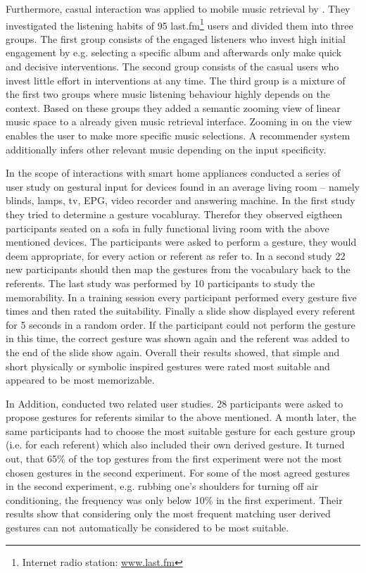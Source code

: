 Furthermore, casual interaction was applied to mobile music retrieval by \cite{boland2015engaging}. They investigated the listening habits of 95 last.fm\footnote{Internet radio station: \url{www.last.fm}} users and divided them into three groups. The first group consists of the engaged listeners who invest high initial engagement by e.g. selecting a specific album and afterwards only make quick and decisive interventions. The second group consists of the casual users who invest little effort in interventions at any time. The third group is a mixture of the first two groups where music listening behaviour highly depends on the context. Based on these groups they added a semantic zooming view of linear music space to a already given music retrieval interface. Zooming in on the view enables the user to make more specific music selections. A recommender system additionally infers other relevant music depending on the input specificity.

In the scope of interactions with smart home appliances \cite{kuhnel2011m} conducted a series of user study on gestural input for devices found in an average living room -- namely blinds, lamps, tv, \ac{EPG}, video recorder and answering machine. In the first study they tried to determine a gesture vocabluray. Therefor they observed eigtheen participants seated on a sofa in fully functional living room with the above mentioned devices. The participants were asked to perform a gesture, they would deem appropriate, for every action or referent as \cite{wobbrock2009user} refer to. In a second study 22 new participants should then map the gestures from the vocabulary back to the referents. The last study was performed by 10 participants to study the memorability. In a training session every participant performed every gesture five times and then rated the suitability. Finally a slide show displayed every referent for 5 seconds in a random order. If the participant could not perform the gesture in this time, the correct gesture was shown again and the referent was added to the end of the slide show again. Overall their results showed, that simple and short physically or symbolic inspired gestures were rated most suitable and appeared to be most memorizable.

In Addition, \cite{choi2012can} conducted two related user studies. 28 participants were asked to propose gestures for referents similar to the above mentioned. A month later, the same participants had to choose the most suitable gesture for each gesture group (i.e. for each referent) which also included their own derived gesture. It turned out, that 65\% of the top gestures from the first experiment were not the most chosen gestures in the second experiment. For some of the most agreed gestures in the second experiment, e.g. rubbing one's shoulders for turning off air conditioning, the frequency was only below 10\% in the first experiment. Their results show that considering only the most frequent matching user derived gestures can not automatically be considered to be most suitable.

